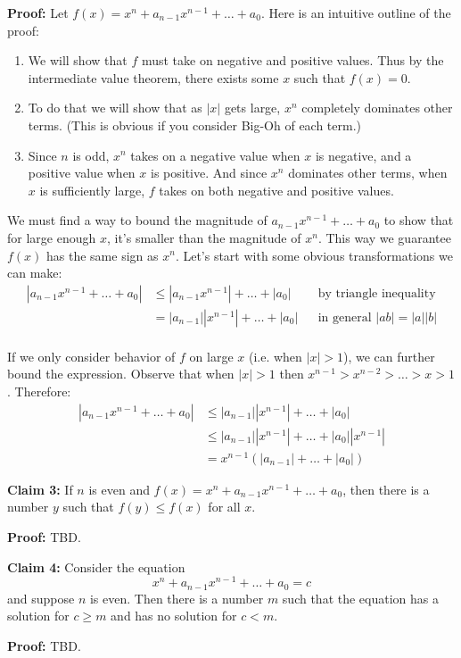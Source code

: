 \textbf{Proof:} Let $f(x)=x^{n}+a_{n-1}x^{n-1}+\ldots+a_{0}$. Here is an
intuitive outline of the proof:
\begin{enumerate}
\item We will show that $f$ must take on negative and positive values.
  Thus by the intermediate value theorem, there exists some $x$ such
  that $f(x)=0$.
\item To do that we will show that as $|x|$ gets large, $x^{n}$
  completely dominates other terms. (This is obvious if you consider
  Big-Oh of each term.)
\item Since $n$ is odd, $x^{n}$ takes on a negative value when $x$ is
  negative, and a positive value when $x$ is positive. And since
  $x^{n}$ dominates other terms, when $x$ is sufficiently large, $f$
  takes on both negative and positive values.
\end{enumerate}

We must find a way to bound the magnitude of
$a_{n-1}x^{n-1}+\ldots+a_{0}$ to show that for large enough $x$, it's
smaller than the magnitude of $x^n$. This way we guarantee $f(x)$ has
the same sign as $x^n$. Let's start with some obvious transformations
we can make:
\begin{align*}
  |a_{n-1}x^{n-1}+\ldots+a_{0}| &\leq |a_{n-1}x^{n-1}|+\ldots+|a_{0}| &&\text{by
                                                            triangle
                                                            inequality}\\
                           &=|a_{n-1}||x^{n-1}|+\ldots+|a_{0}|
                                                         &&\text{in
                                                            general } |ab|=|a||b|\\
\end{align*}

If we only consider behavior of $f$ on large $x$ (i.e. when $|x|>1$),
we can further bound the expression. Observe that when $|x|>1$ then
$x^{n-1}>x^{n-2}>\ldots>x>1$. Therefore:
\begin{align*}
  |a_{n-1}x^{n-1}+\ldots+a_{0}| &\leq |a_{n-1}||x^{n-1}|+\ldots+|a_{0}|\\
                           &\leq |a_{n-1}||x^{n-1}|+\ldots+|a_{0}||x^{n-1}|\\
                           &= x^{n-1}(|a_{n-1}|+\ldots+|a_0|)
\end{align*}

\vs

\textbf{Claim 3:} If $n$ is even and
$f(x)=x^{n}+a_{n-1}x^{n-1}+\ldots+a_{0}$, then there is a number $y$ such
that $f(y)\leq f(x)$ for all $x$.

\vs

\textbf{Proof:} TBD.

\vs

\textbf{Claim 4:} Consider the equation
\[x^{n}+a_{n-1}x^{n-1}+\ldots+a_{0}=c\]
and suppose $n$ is even. Then there is a number $m$ such that the
equation has a solution for $c\geq m$ and has no solution for $c<m$.

\vs

\textbf{Proof:} TBD.

\vs



